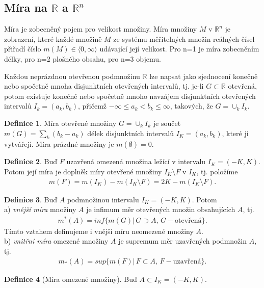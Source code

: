 \documentclass[a4]{report}
\theoremstyle{definition}
\newtheorem{definition}{Definice}[section]
\begin{document}
{\subsection{Míra na $\mathbb{R}$ a $\mathbb{R}^n$}
Míra je zobecněný pojem pro velikost množiny. Míra množiny $M$ v $\mathbb{R}^n$ je zobrazení, které každé množině $M$ ze systému měřitelných množin reálných čísel přiřadí číslo $m(M)\in \langle0,\infty\rangle$ udávající její velikost. Pro n=1 je míra zobecněním délky, pro n=2 plošného obsahu, pro n=3 objemu.  

Každou neprázdnou otevřenou podmnožinu $\mathbb{R}$ lze napsat jako sjednocení
konečně nebo spočetně mnoha disjunktních otevřených intervalů, tj. je-li $G\subset \mathbb{R}$ otevřená, potom existuje konečně nebo spočetně mnoho navzájem disjunktních otevřených intervalů $I_k =(a_k, b_k)$, přičemž $-\infty\leq a_k<b_k\leq \infty$, takových, že $G = \cup_kI_k$.
\begin{definition}
Míra otevřené množiny $G=\cup_k I_k$ je součet $m(G)=\sum_k(b_k-a_k)$ délek disjunktních intervalů $I_K=(a_k,b_k)$, které ji vytvářejí. Míra prázdné množiny je $m(\emptyset)=0$.
\end{definition}
\begin{definition}
Buď $F$ uzavřená omezená množina ležící v intervalu $I_K=(-K,K)$. Potom její míra je doplněk míry otevřené množiny $I_K \setminus F$ v $I_K$, tj. položíme
\begin{align*}
m(F) = m(I_K) - m(I_K \setminus F) = 2K - m(I_K\setminus F).
\end{align*}
\end{definition}
\begin{definition}
Buď $A$ podmnožinou intervalu $I_K=(-K,K)$. Potom\\
a) \textit{vnější míra} množiny $A$ je infimum měr otevřených množin obsahujících $A$, tj. 
\begin{align*}
m^*(A) = inf\{ m(G)|\,G \supset A,\,G-\text{otevřená}\}.
\end{align*}
Tímto vztahem definujeme i vnější míru neomezené množiny $A$.\\
b) \textit{vnitřní míra} omezené množiny $A$ je supremum měr uzavřených podmnožin $A$, tj. 
\begin{align*}
m_*(A)=sup\{m(F)|\,F\subset A,\,F-\text{uzavřená} \}.
\end{align*}
\end{definition}
\begin{definition}[Míra omezené množiny]
Buď $A\subset I_K=(-K,K).$\\

\end{definition}}
\end{document}
